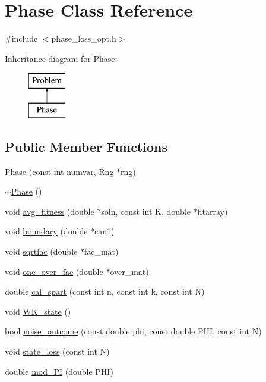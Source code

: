 \hypertarget{class_phase}{}\section{Phase Class Reference}
\label{class_phase}


{\ttfamily \#include $<$phase\+\_\+loss\+\_\+opt.\+h$>$}

Inheritance diagram for Phase\+:\begin{figure}[H]
\begin{center}
\leavevmode
\includegraphics[height=2.000000cm]{class_phase}
\end{center}
\end{figure}
\subsection*{Public Member Functions}
\begin{DoxyCompactItemize}
\item 
\hyperlink{class_phase_a693a2d20b39fa8a91bf5f4c1afa3b2e2}{Phase} (const int numvar, \hyperlink{rng_8h_a0d95a1c4bd7f6516941df17732a09356}{Rng} $\ast$\hyperlink{class_phase_abcd241887b2113672f6dc94877b79079}{rng})
\item 
\hyperlink{class_phase_a9907413eb9a96148934d71864bb7e41b}{$\sim$\+Phase} ()
\item 
void \hyperlink{class_phase_a73864e5e5e43b6fb301cf507eeb118a4}{avg\+\_\+fitness} (double $\ast$soln, const int K, double $\ast$fitarray)
\item 
void \hyperlink{class_phase_a47d8ce9a16f64faa174dd69c3854e3e1}{boundary} (double $\ast$can1)
\item 
void \hyperlink{class_phase_a6100300c5e784c829375cceb5bf2de4c}{sqrtfac} (double $\ast$fac\+\_\+mat)
\item 
void \hyperlink{class_phase_a3e758e9903183f98b634c09ec033517f}{one\+\_\+over\+\_\+fac} (double $\ast$over\+\_\+mat)
\item 
double \hyperlink{class_phase_a386cfe3967d7b3cb11b66ded52237b85}{cal\+\_\+spart} (const int n, const int k, const int N)
\item 
void \hyperlink{class_phase_a58a0068df688f770ed388ad6bf63aa4f}{W\+K\+\_\+state} ()
\item 
bool \hyperlink{class_phase_a6e2d1dd46651a342f46893d93c30041c}{noise\+\_\+outcome} (const double phi, const double P\+H\+I, const int N)
\item 
void \hyperlink{class_phase_a51090ea3a1cd12e9afd73faa48d04627}{state\+\_\+loss} (const int N)
\item 
double \hyperlink{class_phase_a395efd15826aac4793a6c37bf027825b}{mod\+\_\+P\+I} (double P\+H\+I)
\end{DoxyCompactItemize}
